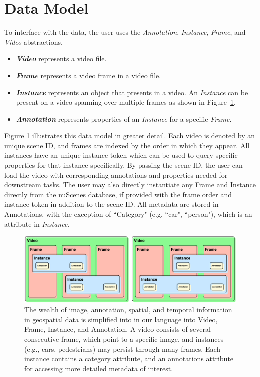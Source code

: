 
\section{Data Model}
\label{section:data-model}

To interface with the data, the user uses the \textit{Annotation}, \textit{Instance}, \textit{Frame}, and \textit{Video} abstractions.
\begin{itemize}
    \item 
    \textbf{\textit{Video}} represents a video file.
    \item 
    \textbf{\textit{Frame}} represents a video frame in a video file.
    \item 
    \textbf{\textit{Instance}} represents an object that presents in a video. An \emph{Instance} can be present on a video spanning over multiple frames as shown in Figure~\ref{fig:abstraction}.
    \item 
    \textbf{\textit{Annotation}} represents properties of an \emph{Instance} for a specific \emph{Frame}.
\end{itemize}
Figure \ref{fig:abstraction} illustrates this data model in greater detail.
Each video is denoted by an unique scene ID, and frames are indexed by the order in which they appear.
All instances have an unique instance token which can be used to query specific properties for that instance specifically.
By passing the scene ID, the user can load the video with corresponding annotations and properties needed for downstream tasks.
The user may also directly instantiate any Frame and Instance directly from the nuScenes database, if provided with the frame order and instance token in addition to the scene ID.
All metadata are stored in Annotations, with the exception of ``Category" (e.g. ``car", ``person"), which is an attribute in \textit{Instance}.

\newcommand{\dataModelCaption}{
The wealth of image, annotation, spatial, and temporal information in geospatial data is simplified into in our language into Video, Frame, Instance, and Annotation.
A video consists of several consecutive frame, which point to a specific image, and instances (e.g., cars, pedestrians) may persist through many frames.
Each instance contains a category attribute, and an annotations attribute for accessing more detailed metadata of interest.
}

\begin{figure}[ht]
    \centering
    \includegraphics[width=\textwidth]{figures/data-abstraction.png}
    \caption{\dataModelCaption}
    \label{fig:abstraction}
\end{figure}

